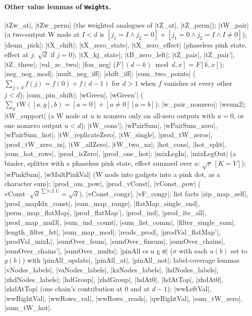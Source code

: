 \paragraph{Other value lemmas of \texttt{Weights}.} \lean|tZw_at|, \lean|tZw_perm| (the weighted
analogues of \lean|tZ_at|, \lean|tZ_perm|); \lean|tW_pair| (a two-output W node at $I<d$ is
$[j_1=I\land j_2=0]+[j_1=0\land j_2=I\land I\ne0]$); \lean|dsum_pick|; \lean|tX_shift|;
\lean|tX_zero_state|, \lean|tX_zero_effect| (phaseless pink state, effect at $j$: $\sqrt d$ if
$j=0$); \lean|tX_kj_state|; \lean|tB_zero_left|; \lean|tZ_pair|, \lean|tZ_pair'|, \lean|tZ_three|;
\lean|val_zc_two|; \lean|fou_neg| ($F[(d-k)\bmod d,x]=\overline{F[k,x]}$); \lean|neg_neg_mod|;
\lean|mult_neg_iff|; \lean|shift_iff|; \lean|sum_two_points| ($\sum_{j<d}f(j)=f(0)+f(d-1)$ for
$d>1$ when $f$ vanishes at every other $j<d$); \lean|sum_pin_shift|; \lean|wGreen|, \lean|wGreen'|
($\sum_g\mathrm{tW}([a,g],b)=[a=0]+[a\ne0][a=b]$); \lean|w_pair_nonzero|; \lean|wsum2|;
\lean|tW_support| (a W node at $u$ is nonzero only on all-zero outputs with $u=0$, or one nonzero
output $u<d$); \lean|tW_cons'|; \lean|wPairSum|, \lean|wPairSum_zero|, \lean|wPairSum_hot|;
\lean|tW_replicateZero|, \lean|tW_single|, \lean|prod_tW_zeros|, \lean|prod_tW_zero_in|,
\lean|tW_allZero|, \lean|tW_two_nz|; \lean|hot_cons|, \lean|hot_split|, \lean|sum_hot_rows|,
\lean|prod_isZero|, \lean|prod_one_hot|; \lean|mixLegIn|, \lean|mixLegOut| (a binder, splitter
with a phaseless pink state, effect summed over $a$: $\sqrt r\,[K=V]$); \lean|wPinkSum|,
\lean|wMultPinkVal| (W node into gadgets into a pink dot, as a character sum); \lean|prod_om_pow|,
\lean|prod_vConst|, \lean|vConst_pow| ($\mathrm{vConst}\cdot\sqrt d^{\sum|c.2.1|}=\sqrt d$),
\lean|vConst_congr|, \lean|vF_congr|; list facts \lean|zip_map_self|, \lean|prod_mapIdx_const|,
\lean|sum_map_range|, \lean|flatMap_single_snd|, \lean|perm_map_flatMap|, \lean|prod_flatMap'|,
\lean|prod_ind|, \lean|prod_ite_all|, \lean|prod_map_mul3|, \lean|sum_ind_count|,
\lean|sum_list_comm|, \lean|filter_single_sum|, \lean|length_filter_fst|, \lean|sum_map_mod|,
\lean|reads_prod|, \lean|prodVal_flatMap'|, \lean|prodVal_mixL|, \lean|sumOver_fsum|,
\lean|sumOver_finsum|, \lean|sumOver_chains|, \lean|sumOver_chains'|, \lean|sumOver_mults|;
\lean|pinAll cs u g σ| ($\sigma$ with each $u(b)$ set to $g(b)$) with \lean|pinAll_update|,
\lean|pinAll_at|, \lean|pinAll_not|; label-coverage lemmas \lean|vNodes_labels|,
\lean|vaNodes_labels|, \lean|kzNodes_labels|, \lean|hdNodes_labels|, \lean|zhdNodes_labels|;
\lean|hdGroup|, \lean|zhdGroup|, \lean|hdAt0|, \lean|hdAtTop|, \lean|zhdAt0|, \lean|zhdAtTop| (one
chain's contribution at $0$ and at $d-1$); \lean|wwLeftVal|, \lean|wwRightVal|, \lean|wwRows_val|,
\lean|wwRows_reads|, \lean|qwRightVal|, \lean|sum_tW_zero|, \lean|sum_tW_hot|.

